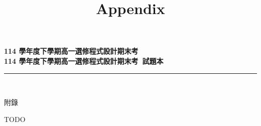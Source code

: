 \documentclass[a4paper]{article}
\title{Appendix}
\begin{document}
\begin{center}
\textbf{\huge 114 學年度下學期高一選修程式設計期末考}\\
\vspace{5mm}
\textbf{\huge 114 學年度下學期高一選修程式設計期末考\ 試題本}\\
\vspace{10mm}
\rule{17cm}{2pt}\\
\vspace{5mm}

\huge 附錄\\
\end{center}

\fontsize{14pt}{20pt}\selectfont

\noindent TODO
\end{document}
